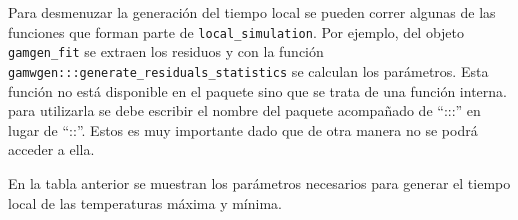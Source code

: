 \documentclass[
  12pt]{article}
\newenvironment{Shaded}{}{}
\newcommand{\CommentTok}[1]{\textcolor[rgb]{0.38,0.63,0.69}{\textit{#1}}}
\newcommand{\DataTypeTok}[1]{\textcolor[rgb]{0.56,0.13,0.00}{#1}}
\newcommand{\KeywordTok}[1]{\textcolor[rgb]{0.00,0.44,0.13}{\textbf{#1}}}
\newcommand{\NormalTok}[1]{#1}
\newcommand{\OperatorTok}[1]{\textcolor[rgb]{0.40,0.40,0.40}{#1}}
\newcommand{\StringTok}[1]{\textcolor[rgb]{0.25,0.44,0.63}{#1}}
\begin{document}
Para desmenuzar la generación del tiempo local se pueden correr algunas de las funciones que forman parte de \texttt{local\_simulation}. Por ejemplo, del objeto \texttt{gamgen\_fit} se extraen los residuos y con la función \texttt{gamwgen:::generate\_residuals\_statistics} se calculan los parámetros. Esta función no está disponible en el paquete sino que se trata de una función interna. para utilizarla se debe escribir el nombre del paquete acompañado de ``:::'' en lugar de ``::''. Estos es muy importante dado que de otra manera no se podrá acceder a ella.

En la tabla anterior se muestran los parámetros necesarios para generar el tiempo local de las temperaturas máxima y mínima.

\begin{Shaded}
\end{Shaded}
\end{document}
